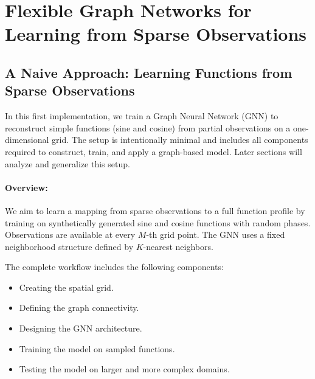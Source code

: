 % 
\section{Flexible Graph Networks for Learning from Sparse Observations}

\subsection{A Naive Approach: Learning Functions from Sparse Observations}

In this first implementation, we train a Graph Neural Network (GNN) to reconstruct simple functions (sine and cosine) from partial observations on a one-dimensional grid. The setup is intentionally minimal and includes all components required to construct, train, and apply a graph-based model. Later sections will analyze and generalize this setup.

\paragraph{Overview:}
We aim to learn a mapping from sparse observations to a full function profile by training on synthetically generated sine and cosine functions with random phases. Observations are available at every $M$-th grid point. The GNN uses a fixed neighborhood structure defined by $K$-nearest neighbors.

\vspace{1em}
\noindent The complete workflow includes the following components:

\begin{itemize}
  \item Creating the spatial grid.
  \item Defining the graph connectivity.
  \item Designing the GNN architecture.
  \item Training the model on sampled functions.
  \item Testing the model on larger and more complex domains.
\end{itemize}

